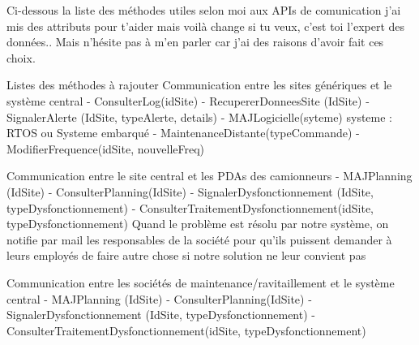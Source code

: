 Ci-dessous la liste des méthodes utiles selon moi aux APIs de comunication
j'ai mis des attributs pour t'aider mais voilà change si tu veux, c'est toi l'expert des données..
Mais n'hésite pas à m'en parler car j'ai des raisons d'avoir fait ces choix.

Listes des méthodes à rajouter
Communication entre les sites génériques et le système central
    - ConsulterLog(idSite)
    - RecupererDonneesSite (IdSite)
    - SignalerAlerte (IdSite, typeAlerte, details)
    - MAJLogicielle(syteme)
             systeme : RTOS ou Systeme embarqué
    - MaintenanceDistante(typeCommande)
    - ModifierFrequence(idSite, nouvelleFreq)

Communication entre le site central et les PDAs des camionneurs
    - MAJPlanning (IdSite)
    - ConsulterPlanning(IdSite)
    - SignalerDysfonctionnement (IdSite, typeDysfonctionnement)
    - ConsulterTraitementDysfonctionnement(idSite, typeDysfonctionnement)
            Quand le problème est résolu par notre système, on notifie par mail les responsables
            de la société pour qu'ils puissent demander à leurs employés de faire autre chose 
            si notre solution ne leur convient pas

Communication entre les sociétés de maintenance/ravitaillement et le système central
    - MAJPlanning (IdSite)
    - ConsulterPlanning(IdSite)
    - SignalerDysfonctionnement (IdSite, typeDysfonctionnement)
    - ConsulterTraitementDysfonctionnement(idSite, typeDysfonctionnement)

